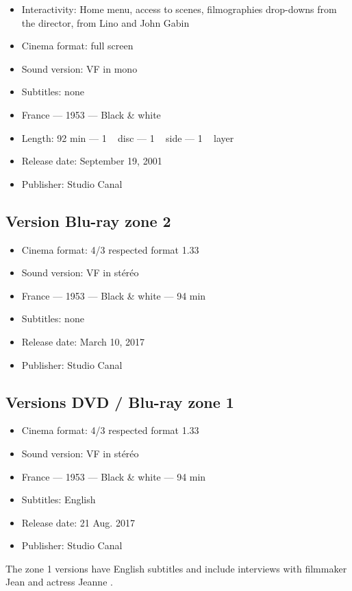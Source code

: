 \begin{itemize}
    \item Interactivity: Home menu, access to scenes, filmographies drop-downs from the director, from Lino  and John \familyname Gabin{}
    \item Cinema format: full screen
    \item Sound version: VF in mono
    \item Subtitles: none
    \item France --- 1953 --- Black \& white
    \item Length: 92 min --- 1 ~ disc --- 1 ~ side --- 1 ~ layer
    \item Release date: September 19, 2001
    \item Publisher: Studio Canal
\end{itemize}

\subsection*{Version Blu-ray zone 2}

\begin{itemize}
	\item Cinema format: 4/3 respected format 1.33
	\item Sound version: VF in stéréo
	\item France --- 1953 --- Black \& white --- 94 min
	\item Subtitles: none
	\item Release date: March 10, 2017
	\item Publisher: Studio Canal
\end{itemize}

\subsection*{Versions DVD / Blu-ray zone 1}

\begin{itemize}
	\item Cinema format: 4/3 respected format 1.33
	\item Sound version: VF in stéréo
	\item France --- 1953 --- Black \& white --- 94 min
	\item Subtitles: English
	\item Release date: 21 Aug. 2017
	\item Publisher: Studio Canal
\end{itemize}

The zone 1 versions have English subtitles and include interviews with filmmaker Jean  and actress Jeanne .

